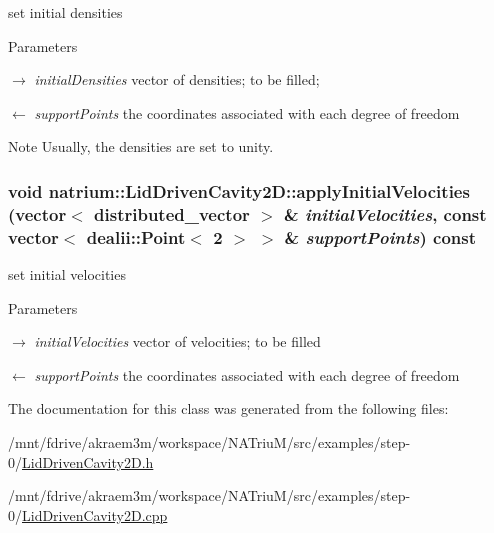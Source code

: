 set initial densities 
\begin{DoxyParams}{Parameters}
\item[\mbox{$\rightarrow$} {\em initialDensities}]vector of densities; to be filled; \item[\mbox{$\leftarrow$} {\em supportPoints}]the coordinates associated with each degree of freedom \end{DoxyParams}
\begin{DoxyNote}{Note}
Usually, the densities are set to unity. 
\end{DoxyNote}
\hypertarget{classnatrium_1_1LidDrivenCavity2D_a6e633e30cfeae500757bdd4c37a5c478}{
\subsubsection[{applyInitialVelocities}]{\setlength{\rightskip}{0pt plus 5cm}void natrium::LidDrivenCavity2D::applyInitialVelocities (vector$<$ distributed\_\-vector $>$ \& {\em initialVelocities}, \/  const vector$<$ dealii::Point$<$ 2 $>$ $>$ \& {\em supportPoints}) const}}
\label{classnatrium_1_1LidDrivenCavity2D_a6e633e30cfeae500757bdd4c37a5c478}


set initial velocities 
\begin{DoxyParams}{Parameters}
\item[\mbox{$\rightarrow$} {\em initialVelocities}]vector of velocities; to be filled \item[\mbox{$\leftarrow$} {\em supportPoints}]the coordinates associated with each degree of freedom \end{DoxyParams}


The documentation for this class was generated from the following files:\begin{DoxyCompactItemize}
\item 
/mnt/fdrive/akraem3m/workspace/NATriuM/src/examples/step-\/0/\hyperlink{LidDrivenCavity2D_8h}{LidDrivenCavity2D.h}\item 
/mnt/fdrive/akraem3m/workspace/NATriuM/src/examples/step-\/0/\hyperlink{LidDrivenCavity2D_8cpp}{LidDrivenCavity2D.cpp}\end{DoxyCompactItemize}

